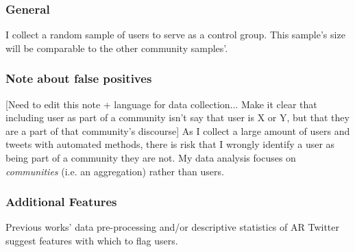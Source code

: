 \documentclass[acmlarge, screen, authorversion]{acmart}
\begin{document}
    \subsubsection{General}
    
    I collect a random sample of users to serve as a control group. This sample's size will be comparable to the other community samples'.
    
    
    
    \subsubsection{Note about false positives} [Need to edit this note + language for data collection... Make it clear that including user as part of a community isn't say that user is X or Y, but that they are a part of that community's discourse]  As I collect a large amount of users and tweets with automated methods, there is risk that I wrongly identify a user as being part of a community they are not. My data analysis focuses on \textit{communities} (i.e. an aggregation) rather than users. 
    

    \subsubsection{Additional Features}
    
    Previous works' \cite{bergerAltrightTwitterCensus2018, alizadehPsychologyMoralityPolitical2019} data pre-processing and/or descriptive statistics of AR Twitter suggest features with which to flag users.
    
\end{document}

